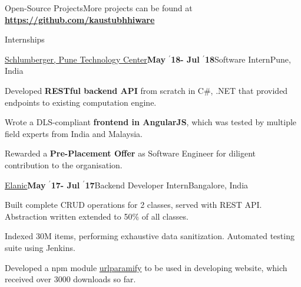\documentclass{resume} %
\begin{document}
\begin{rSection}{\large Open-Source Projects}{}{More projects can be found at \textbf{\large \url{https://github.com/kaustubhhiware}}}

\end{rSection}


\begin{rSection}{Internships}
\begin{rSubsection}{\large \href{https://drive.google.com/file/d/1EcfIC_g8bx3whaxMdOkFyZx4TCqA1RAq/view?usp=sharing}{Schlumberger, Pune Technology Center}}{\textbf{\large May $^{\prime}$18- Jul $^{\prime}$18}}{Software Intern}{Pune, India}
\item Developed {\bf RESTful backend API} from scratch in C\#, .NET that provided endpoints to existing computation engine.
\item Wrote a DLS-compliant {\bf frontend in AngularJS}, which was tested  by multiple field experts from India and Malaysia.
\item Rewarded a {\bf Pre-Placement Offer} as Software Engineer for diligent contribution to the organisation.
\end{rSubsection}

\begin{rSubsection}{\large \href{https://drive.google.com/file/d/0B5iU6cWw36rOVWZIcllPY3RSd2c/view?usp=sharing}{Elanic}}{\textbf{\large May $^{\prime}$17- Jul $^{\prime}$17}}{Backend Developer Intern}{Bangalore, India}
\item Built complete CRUD operations for 2 classes, served with REST API. Abstraction written extended to 50\% of all classes.
\item Indexed 30M items, performing exhaustive data sanitization. Automated testing suite using Jenkins.
\item Developed a npm module \href{https://www.npmjs.com/package/urlparamify}{urlparamify} to be used in developing website, which received over 3000 downloads so far.
\end{rSubsection}


\end{rSection}
\end{document}
